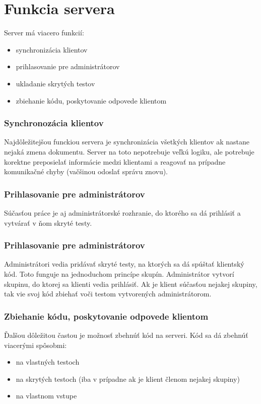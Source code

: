 \chapter{Funkcia servera}

\label{kap:server} %

Server má viacero funkcií:
\begin{itemize}
\item synchronizácia klientov
\item prihlasovanie pre administrátorov
\item ukladanie skrytých testov
\item zbiehanie kódu, poskytovanie odpovede klientom
\end{itemize}


\subsection{Synchronozácia klientov}
Najdôležitejšou funckiou servera je synchronizácia všetkých klientov ak nastane nejaká zmena
dokumentu. Server na toto nepotrebuje veľkú logiku, ale potrebuje korektne preposielať informácie
medzi klientami a reagovať na prípadne komunikačné chyby (vačšinou odoslať správu znovu).


\subsection{Prihlasovanie pre administrátorov}
Súčasťou práce je aj administrátorské rozhranie, do ktorého sa dá prihlásiť a vytvárať v ňom
skryté testy.

\subsection{Prihlasovanie pre administrátorov}
Administrátori vedia pridávať skryté testy, na ktorých
sa dá spúštať klientský kód. Toto funguje na jednoduchom princípe skupín. Administrátor vytvorí 
skupinu, do ktorej sa klienti vedia prihlásiť. Ak je klient súčasťou nejakej skupiny, tak vie svoj
kód zbiehať voči testom vytvorených administrátorom.

\subsection{Zbiehanie kódu, poskytovanie odpovede klientom}
Ďalšou dôležitou častou je možnosť zbehnúť kód na serveri. Kód sa dá zbehnúť viacerými spôsobmi:
\begin{itemize}
\item na vlastných testoch
\item na skrytých testoch (iba v prípadne ak je klient členom nejakej skupiny)
\item na vlastnom vstupe
\end{itemize}
